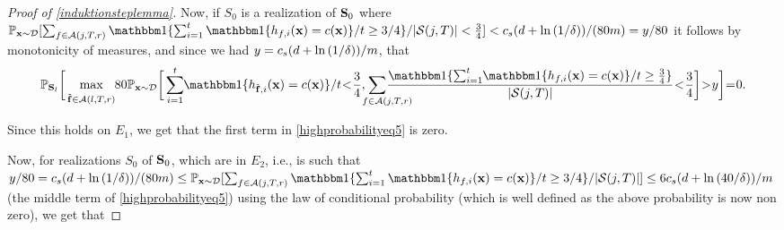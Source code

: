 \begin{proof}[Proof of \cref{induktionsteplemma}]
Now, if $S_0$ is a realization of $\mathbf{S}_{0}$ where $ \p_{\rx\sim \cD}[\sum_{f\in \cA(j,T,r)} \ind\{\sum_{i=1}^{t} \ind\{h_{f,i}(\rx)=c(\rx)\}/t\geq 3/4\}/|\cS(j,T)|<\frac{3}{4}
 ]< \cs(d+\ln{\left(1/\delta \right)})/(80m)=y/80$ it follows by monotonicity of measures, and since we had $y=c_s(d+\ln{\left(1/\delta \right)})/m$, that
\begin{align*}%
  \p_{\rS_{l}}\bigg[   \max_{\stackrel{}{\rf\in\cA(l,T,r)}} \negmedspace 80\p_{\rx\sim \cD}
  \bigg[ \sum_{i=1}^{t}\negmedspace  \ind\{h_{\rf,i}(\rx)=c(\rx)\}/t\negmedspace <\negmedspace \frac{3}{4},
  \negmedspace \negmedspace  \negmedspace  \negmedspace \negmedspace  \negmedspace \negmedspace \negmedspace \negmedspace\sum_{\text{\quad\quad}f\in \cA(j,T,r)} \negmedspace \negmedspace \negmedspace \negmedspace\negmedspace \negmedspace  \negmedspace \negmedspace \negmedspace \negmedspace \frac{\ind\{\sum_{i=1}^{t}\negmedspace  \ind\{h_{f,i}(\rx)=c(\rx)\}/t\geq \frac{3}{4}\}}{|\cS(j,T)|}
  \negmedspace<\negmedspace\frac{3}{4}\bigg]\negmedspace>\negmedspace y\bigg]\negmedspace=\negmedspace0.
\end{align*} 

Since this holds on $E_1$, we get that the first term in \cref{highprobabilityeq5} is zero.  

Now, for realizations $S_0$ of $\mathbf{S}_0$, which are in $ E_{2}$, i.e., is such that $y/80=\cs(d+\ln{\left(1/\delta \right)})/(80m)\leq \p_{\rx\sim \cD}[\sum_{f\in \cA(j,T,r)} \ind\{\sum_{i=1}^{t} \ind\{h_{f,i}(\rx)=c(\rx)\}/t\geq 3/4\}/|\cS(j,T)|]\leq 6\cs(d+\ln{\left(\cnn/\delta \right)})/m$ (the middle term of \cref{highprobabilityeq5}) using the law of conditional probability (which is well defined as the above probability is now non zero), we get that





\end{proof}
